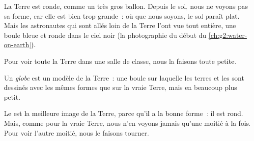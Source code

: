 La Terre est ronde, comme un très gros ballon. Depuis le sol, nous ne
voyons pas sa forme, car elle est bien trop grande~: où que nous soyons, le
sol paraît plat. Mais les astronautes qui sont allés loin de la Terre l'ont
vue tout entière, une boule bleue et ronde dans le ciel noir (la
photographie du début du \cref{ch:g2:water-on-earth}).

Pour voir toute la Terre dans une salle de classe, nous la faisons toute petite.

\begin{definition}[Globe]\label{def:g3:continents-and-oceans:globe}
Un \emph{globe} est un modèle de la Terre~: une boule sur
laquelle les terres et les  sont dessinés avec les mêmes formes que
sur la vraie Terre, mais en beaucoup plus petit.
\end{definition}

Le  est la meilleure image de la Terre, parce qu'il a la bonne
forme~: il est rond. Mais, comme pour la vraie Terre, nous n'en voyons
jamais qu'une moitié à la fois. Pour voir l'autre moitié, nous le faisons
tourner.

